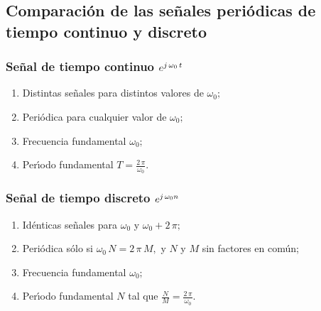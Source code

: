 \subsection{Comparaci\'{o}n de las se\~{n}ales peri\'{o}dicas de tiempo continuo y discreto}

\subsubsection{Se\~{n}al de tiempo continuo $e^{j \, \protect\omega_{0} \, t}$}

\begin{enumerate}
\item Distintas se\~{n}ales para distintos valores de $\omega_{0};$

\item Peri\'{o}dica para cualquier valor de $\omega_{0};$

\item Frecuencia fundamental $\omega_{0};$

\item Per\'{\i}odo fundamental $T = \frac{2 \, \pi}{\omega_{0}}.$
\end{enumerate}

\subsubsection{Se\~{n}al de tiempo discreto $e^{j \, \protect\omega_{0}n}$}

\begin{enumerate}
\item Id\'{e}nticas se\~{n}ales para $\omega_{0}$ y $\omega_{0}+2 \, \pi
  ;$

\item Peri\'{o}dica s\'{o}lo si $\omega_{0} \, N=2 \, \pi \, M,$ y $N$ y $M$ sin
  factores en com\'{u}n;

\item Frecuencia fundamental $\omega_{0};$

\item Per\'{\i}odo fundamental $N$ tal que $\frac{N}{M} = \frac{2 \, \pi }{\omega_{0}}.$
\end{enumerate}

% 

